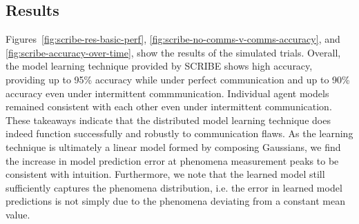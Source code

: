 


\subsection{Results}

Figures~\ref{fig:scribe-res-basic-perf}, \ref{fig:scribe-no-comms-v-comms-accuracy}, and \ref{fig:scribe-accuracy-over-time}, show the results of the simulated trials. Overall, the model learning technique provided by SCRIBE shows high accuracy, providing up to 95\% accuracy while under perfect communication and up to 90\% accuracy even under intermittent commmunication. Individual agent models remained consistent with each other even under intermittent communication. These takeaways indicate that the distributed model learning technique does indeed function successfully and robustly to communication flaws. As the learning technique is ultimately a linear model formed by composing Gaussians, we find the increase in model prediction error at phenomena measurement peaks to be consistent with intuition. Furthermore, we note that the learned model still sufficiently captures the phenomena distribution, i.e. the error in learned model predictions is not simply due to the phenomena deviating from a constant mean value.

